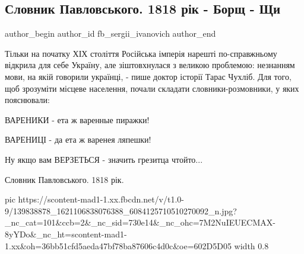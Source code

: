  
 
 
 
 
\subsection{Словник Павловського. 1818 рік - Борщ - Щи}
\ifcmt
  author_begin
   author_id fb_sergii_ivanovich
  author_end
\fi

Тільки на початку ХІХ століття Російська імперія нарешті по-справжньому
відкрила для себе Україну, але зіштовхнулася з великою проблемою: незнанням
мови, на якій говорили українці, - пише доктор історії Тарас Чухліб. Для того,
щоб зрозуміти місцеве населення, почали складати словники-розмовники, у яких
пояснювали:

ВАРЕНИКИ - ета ж варенные пиражки!

ВАРЕНИЦІ - да ета ж варенея ляпешки!

Ну якщо вам ВЕРЗЕТЬСЯ - значить грезитца чтойто...

Словник Павловського. 1818 рік.

\ifcmt
  pic https://scontent-mad1-1.xx.fbcdn.net/v/t1.0-9/139838878_1621106838076388_6084125710510270092_n.jpg?_nc_cat=101&ccb=2&_nc_sid=730e14&_nc_ohc=7M2NuIEUECMAX-8yYDo&_nc_ht=scontent-mad1-1.xx&oh=36bb51cfd5aeda47bf78ba87606c4d0c&oe=602D5D05
  width 0.8
\fi

